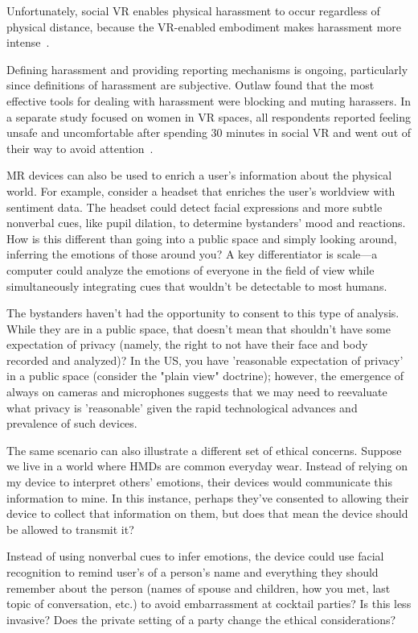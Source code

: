 Unfortunately, social VR enables physical harassment to occur regardless of physical distance, because the VR-enabled embodiment  makes harassment more intense~\cite{blackwell}.

Defining harassment and providing reporting mechanisms is ongoing, particularly since definitions of harassment are subjective. Outlaw found that the most effective tools for dealing with harassment were blocking and muting harassers. In a separate study focused on women in VR spaces, all respondents reported feeling unsafe and uncomfortable after spending 30 minutes in social VR and went out of their way to avoid attention~\cite{outlaw2017}.

MR devices can also be used to enrich a user's information about the physical world. For example, consider a headset that enriches the user's worldview with sentiment data. The headset could detect facial expressions and more subtle nonverbal cues, like pupil dilation, to determine bystanders' mood and reactions. How is this different than going into a public space and simply looking around, inferring the emotions of those around you? A key differentiator is scale---a computer could analyze the emotions of everyone in the field of view while simultaneously integrating cues that wouldn't be detectable to most humans.

The bystanders haven't had the opportunity to consent to this type of analysis. While they are in a public space, that doesn't mean that shouldn't have some expectation of privacy (namely, the right to not have their face and body recorded and analyzed)? In the US, you have 'reasonable expectation of privacy' in a public space (consider the "plain view" doctrine); however, the emergence of always on cameras and microphones suggests that we may need to reevaluate what privacy is 'reasonable' given the rapid technological advances and prevalence of such devices.

The same scenario can also illustrate a different set of ethical concerns. Suppose we live in a world where HMDs are common everyday wear. Instead of relying on my device to interpret others' emotions, their devices would communicate this information to mine. In this instance, perhaps they've consented to allowing their device to collect that information on them, but does that mean the device should be allowed to transmit it?

Instead of using nonverbal cues to infer emotions, the device could use facial recognition to remind user's of a person's name and everything they should remember about the person (names of spouse and children, how you met, last topic of conversation, etc.) to avoid embarrassment at cocktail parties\cite{wassom2014augmented}? Is this less invasive? Does the private setting of a party change the ethical considerations?

